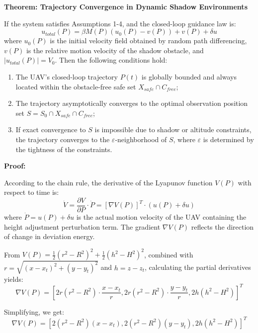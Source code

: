 \documentclass[final,3p,times,numbers]{elsarticle}
\begin{document}
\textbf{Theorem: Trajectory Convergence in Dynamic Shadow Environments}

If the system satisfies Assumptions 1-4, and the closed-loop guidance law is:
\begin{equation}
u_{total}(P) = \beta M(P)(u_0(P) - v(P)) + v(P) + \delta u \label{eq:3-24}
\end{equation}
where $u_0(P)$ is the initial velocity field obtained by random path differencing, $v(P)$ is the relative motion velocity of the shadow obstacle, and $|u_{total}(P)| = V_0$. Then the following conditions hold:
\begin{enumerate}
    \item The UAV's closed-loop trajectory $P(t)$ is globally bounded and always located within the obstacle-free safe set $X_{safe} \cap C_{free}$;
    \item The trajectory asymptotically converges to the optimal observation position set $S = S_0 \cap X_{safe} \cap C_{free}$;
    \item If exact convergence to $S$ is impossible due to shadow or altitude constraints, the trajectory converges to the $\varepsilon$-neighborhood of $S$, where $\varepsilon$ is determined by the tightness of the constraints.
\end{enumerate}

\textbf{Proof:}

According to the chain rule, the derivative of the Lyapunov function $V(P)$ with respect to time is:
\begin{equation}
\dot{V} = \frac{\partial V}{\partial P} \cdot \dot{P} = [\nabla V(P)]^T \cdot (u(P) + \delta u) \label{eq:3-25}
\end{equation}
where $\dot{P} = u(P) + \delta u$ is the actual motion velocity of the UAV containing the height adjustment perturbation term. The gradient $\nabla V(P)$ reflects the direction of change in deviation energy.

From $V(P) = \frac{1}{2}(r^2 - R^2)^2 + \frac{1}{2}(h^2 - H^2)^2$, combined with $r = \sqrt{(x-x_t)^2 + (y-y_t)^2}$ and $h = z - z_t$, calculating the partial derivatives yields:
\[ \nabla V(P) = \left[ 2r(r^2 - R^2) \cdot \frac{x-x_t}{r}, 2r(r^2 - R^2) \cdot \frac{y-y_t}{r}, 2h(h^2 - H^2) \right]^T \]

Simplifying, we get:
\begin{equation}
\nabla V(P) = [2(r^2 - R^2)(x-x_t), 2(r^2 - R^2)(y-y_t), 2h(h^2 - H^2)]^T \label{eq:3-26}
\end{equation}
\end{document}
